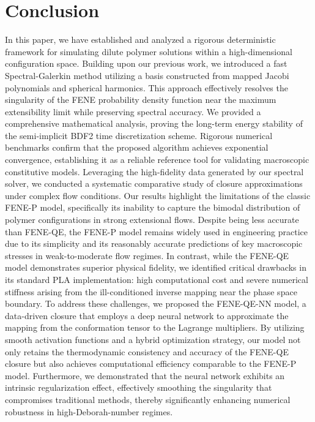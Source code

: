 \documentclass[preprint,12pt]{elsarticle}
\begin{document}
\section{Conclusion}
In this paper, we have established and analyzed a rigorous deterministic framework for simulating dilute polymer solutions within a high-dimensional configuration space. Building upon our previous work, we introduced a fast Spectral-Galerkin method utilizing a basis constructed from mapped Jacobi polynomials and spherical harmonics. This approach effectively resolves the singularity of the FENE probability density function near the maximum extensibility limit while preserving spectral accuracy. We provided a comprehensive mathematical analysis, proving the long-term energy stability of the semi-implicit BDF2 time discretization scheme. Rigorous numerical benchmarks confirm that the proposed algorithm achieves exponential convergence, establishing it as a reliable reference tool for validating macroscopic constitutive models.
Leveraging the high-fidelity data generated by our spectral solver, we conducted a systematic comparative study of closure approximations under complex flow conditions. Our results highlight the limitations of the classic FENE-P model, specifically its inability to capture the bimodal distribution of polymer configurations in strong extensional flows. Despite being less accurate than FENE-QE, the FENE-P model remains widely used in engineering practice due to its simplicity and its reasonably accurate predictions of key macroscopic stresses in weak-to-moderate flow regimes. In contrast, while the FENE-QE model demonstrates superior physical fidelity, we identified critical drawbacks in its standard PLA implementation: high computational cost and severe numerical stiffness arising from the ill-conditioned inverse mapping near the phase space boundary.
To address these challenges, we proposed the FENE-QE-NN model, a data-driven closure that employs a deep neural network to approximate the mapping from the conformation tensor to the Lagrange multipliers. By utilizing smooth activation functions and a hybrid optimization strategy, our model not only retains the thermodynamic consistency and accuracy of the FENE-QE closure but also achieves computational efficiency comparable to the FENE-P model. Furthermore, we demonstrated that the neural network exhibits an intrinsic regularization effect, effectively smoothing the singularity that compromises traditional methods, thereby significantly enhancing numerical robustness in high-Deborah-number regimes.
\end{document}
